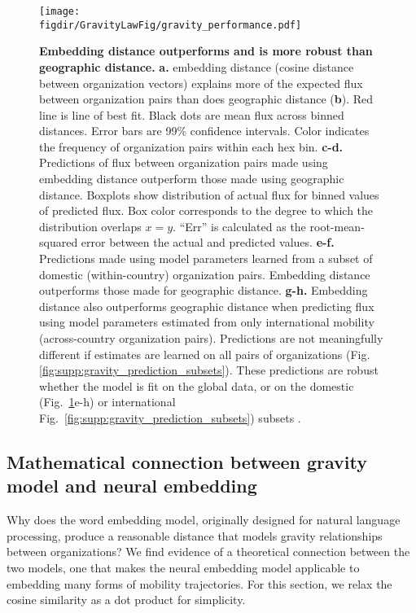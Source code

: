 \documentclass[12pt]{article} %
\def\figdir{../Figs}
\begin{document}
%
%
\begin{figure}[h!]
	\centering
	\texttt{[image: \\figdir/GravityLawFig/gravity\_performance.pdf]}
	\caption{
		\textbf{Embedding distance outperforms and is more robust than geographic distance.}
		\textbf{a.} embedding distance (cosine distance between organization vectors) explains more of the expected flux between organization pairs than does geographic distance (\textbf{b}).
		Red line is line of best fit.
		Black dots are mean flux across binned distances.
		Error bars are 99\% confidence intervals.
		Color indicates the frequency of organization pairs within each hex bin.
		\textbf{c-d.} Predictions of flux between organization pairs made using embedding distance outperform those made using geographic distance.
		Boxplots show distribution of actual flux for binned values of predicted flux.
		Box color corresponds to the degree to which the distribution overlaps $x = y$.
		``Err'' is calculated as the root-mean-squared error between the actual and predicted values.
		\textbf{e-f.} Predictions made using model parameters learned from a subset of domestic (within-country) organization pairs.
		Embedding distance outperforms those made for geographic distance.
		\textbf{g-h.} Embedding distance also outperforms geographic distance when predicting flux using model parameters estimated from only international mobility (across-country organization pairs).
		Predictions are not meaningfully different if estimates are learned on all pairs of organizations (Fig. \ref{fig:supp:gravity_prediction_subsets}).
		These predictions are robust whether the model is fit on the global data, or on the domestic (Fig.~\ref{fig:gravity_performance}e-h) or international Fig.~\ref{fig:supp:gravity_prediction_subsets}) subsets .
	}
	\label{fig:gravity_performance}
\end{figure}


%
%
\subsection*{Mathematical connection between gravity model and neural embedding }

Why does the word embedding model, originally designed for natural language processing, produce a reasonable distance that models gravity relationships between organizations?
We find evidence of a theoretical connection between the two models, one that makes the neural embedding model applicable to embedding many forms of mobility trajectories. For this section, we relax the cosine similarity as a dot product for simplicity.
\end{document}
